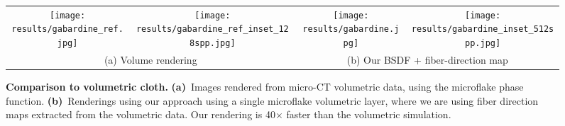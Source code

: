 \begin{figure*}[t]
	\centering
	\addtolength{\tabcolsep}{-3.5pt}
	\begin{tabular}{cccc}
		\texttt{[image: results/gabardine\_ref.jpg]} &
		\texttt{[image: results/gabardine\_ref\_inset\_128spp.jpg]} &
		\texttt{[image: results/gabardine.jpg]} &
		\texttt{[image: results/gabardine\_inset\_512spp.jpg]} \\
		\multicolumn{2}{c}{(a) Volume rendering} & \multicolumn{2}{c}{(b) Our BSDF + fiber-direction map}
	\end{tabular}
	\caption{\label{fig:redcloth}
		\textbf{Comparison to volumetric cloth.} \textbf{(a)}~Images rendered from micro-CT volumetric data, using the microflake phase function. \textbf{(b)}~Renderings using our approach using a single microflake volumetric layer, where we are using fiber direction maps extracted from the volumetric data. Our rendering is 40$\times$ faster than the volumetric simulation.
	}
\end{figure*} 